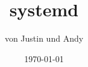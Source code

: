 %
%
%




\title[section77 e.V. - systemd]{systemd} %

\author{von Justin und Andy}        %
\date{\today}                 %




\begin{frame}      %
  \titlepage        %
\end{frame}


